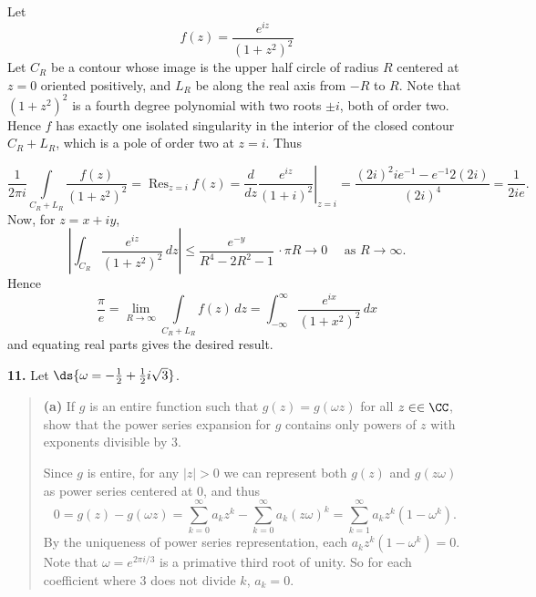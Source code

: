 \documentclass{homework}
\DeclareMathOperator*{\Res}{Res}
\begin{document}
\begin{solution}
  Let 
  $$
    f(z) = \frac{e^{iz}}{(1+z^2)^2}
  $$
  Let $C_R$ be a contour whose image is the upper half circle of radius $R$ centered at $z=0$ oriented positively, and $L_R$ be along the real axis from $-R$ to $R$.  Note that $(1+z^2)^2$ is a fourth degree polynomial with two roots $\pm
  i$, both of order two.  Hence $f$ has exactly one isolated singularity in the interior of the closed contour $C_R + L_R$, which is a pole of order two at $z=i$.  Thus
  \begin{center}
  \end{center}

  $$
    \frac{1}{2\pi i}\int\limits_{C_R + L_R} \frac{f(z)}{(1+z^2)^2} = \Res_{z=i} f(z) = \left.\frac d{dz} \frac{e^{iz}}{(1+i)^2} \right|_{z=i} = \frac{(2i)^2 ie^{-1} - e^{-1}2(2i)}{(2i)^4} = \frac{1}{2ie}. 
  $$
  Now, for $z = x+iy$,
  $$
    \left|\int_{C_R} \frac{e^{iz}}{(1+z^2)^2}\,dz\right| \le \frac{e^{-y}}{R^4 - 2R^2 -1}\,\cdot\pi R \to 0\quad\text{ as }R\to\infty.
  $$
  Hence 
  $$
    \frac{\pi}{e} = \lim_{R\to \infty}\int\limits_{C_R + L_R} f(z)\,dz = \int_{-\infty}^\infty \frac{e^{ix}}{(1+x^2)^2}\,dx
  $$
  and equating real parts gives the desired result.
\end{solution}

{\bf 11.} Let $\ds{\omega = -\frac 12  + \frac 12i\sqrt 3}$.  
\begin{quote}
  {\bf (a)} If $g$ is an entire function such that $g(z) = g(\omega z)$ for all $z\in \in \CC$, show that the power series expansion for $g$ contains only powers of $z$ with exponents divisible by 3.
  \begin{solution}
    Since $g$ is entire, for any $|z|>0$ we can represent both $g(z)$ and $g(z\omega)$ as power series centered at 0, and thus
    $$
      0 = g(z) - g(\omega z) = \sum_{k=0}^\infty a_k z^k - \sum_{k=0}^\infty a_k (z\omega)^k = \sum_{k=1}^\infty a_k z^k (1 - \omega^k).
    $$
    By the uniqueness of power series representation, each $a_kz^k (1 - \omega^k) = 0$. Note that $\omega = e^{2\pi i/3}$ is a primative third root of unity.  So for each coefficient where 3 does not divide $k$, $a_k = 0$.
  \end{solution}
\end{quote}
\end{document}
